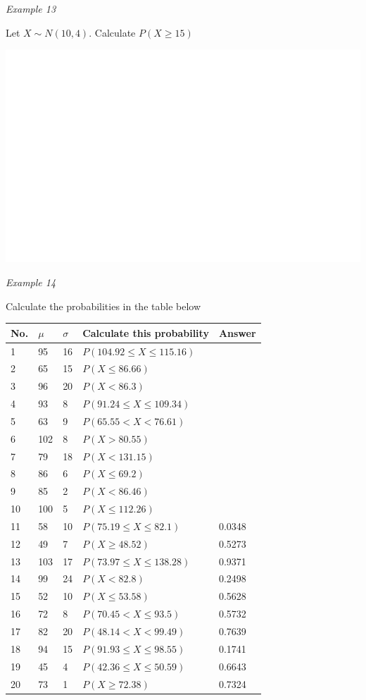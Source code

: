 \documentclass[]{book}
\begin{document}
\emph{Example 13}

Let \(X \sim N(10,4).\) Calculate \(P(X \geq 15)\)

\begin{center}\includegraphics[width=1\linewidth]{figure/Ch1box17-1} \end{center}

\emph{Example 14}

Calculate the probabilities in the table below

\begin{longtable}[]{@{}lllll@{}}
\toprule
No. & \(\mu\) & \(\sigma\) & Calculate this probability & Answer\tabularnewline
\midrule
\endhead
1 & 95 & 16 & \(P(104.92 \leq X \leq 115.16)\) &\tabularnewline
2 & 65 & 15 & \(P(X \leq 86.66)\) &\tabularnewline
3 & 96 & 20 & \(P( X < 86.3)\) &\tabularnewline
4 & 93 & 8 & \(P(91.24 \leq X \leq 109.34)\) &\tabularnewline
5 & 63 & 9 & \(P(65.55 < X < 76.61)\) &\tabularnewline
6 & 102 & 8 & \(P( X > 80.55)\) &\tabularnewline
7 & 79 & 18 & \(P(X < 131.15)\) &\tabularnewline
8 & 86 & 6 & \(P( X \leq 69.2)\) &\tabularnewline
9 & 85 & 2 & \(P(X < 86.46)\) &\tabularnewline
10 & 100 & 5 & \(P(X \leq 112.26)\) &\tabularnewline
11 & 58 & 10 & \(P(75.19 \leq X \leq 82.1)\) & 0.0348\tabularnewline
12 & 49 & 7 & \(P(X \geq 48.52)\) & 0.5273\tabularnewline
13 & 103 & 17 & \(P(73.97 \leq X \leq 138.28)\) & 0.9371\tabularnewline
14 & 99 & 24 & \(P( X < 82.8)\) & 0.2498\tabularnewline
15 & 52 & 10 & \(P( X \leq 53.58)\) & 0.5628\tabularnewline
16 & 72 & 8 & \(P(70.45 < X \leq 93.5)\) & 0.5732\tabularnewline
17 & 82 & 20 & \(P(48.14 < X < 99.49)\) & 0.7639\tabularnewline
18 & 94 & 15 & \(P(91.93 \leq X \leq 98.55)\) & 0.1741\tabularnewline
19 & 45 & 4 & \(P(42.36 \leq X \leq 50.59)\) & 0.6643\tabularnewline
20 & 73 & 1 & \(P(X \geq 72.38)\) & 0.7324\tabularnewline
\bottomrule
\end{longtable}
\end{document}
